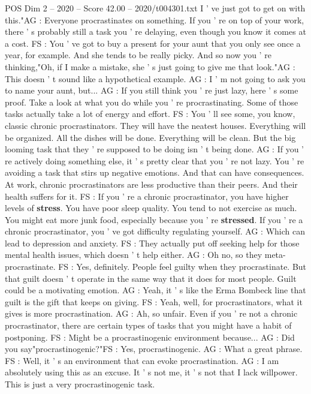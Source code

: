 \begin{textsample}{POS Dim 2 – 2020 – Score 42.00 – 2020/t004301.txt}
I ' ve just got to get on with this."AG : Everyone procrastinates on something.
If you ' re on top of your work, there ' s probably still a task you ' re delaying, even though you know it comes at a cost.
FS : You ' ve got to buy a present for your aunt that you only see once a year, for example.
And she tends to be really picky.
And so now you ' re thinking,"Oh, if I make a mistake, she ' s just going to give me that look."AG : This doesn ' t sound like a hypothetical example.
AG : I ' m not going to ask you to name your aunt, but...
AG : If you still think you ' re just lazy, here ' s some proof.
Take a look at what you do while you ' re procrastinating.
Some of those tasks actually take a lot of energy and effort.
FS : You ' ll see some, you know, classic chronic procrastinators.
They will have the neatest houses.
Everything will be organized.
All the dishes will be done.
Everything will be clean.
But the big looming task that they ' re supposed to be doing isn ' t being done.
AG : If you ' re actively doing something else, it ' s pretty clear that you ' re not lazy.
You ' re avoiding a task that stirs up negative emotions.
And that can have consequences.
At work, chronic procrastinators are less productive than their peers.
And their health suffers for it.
FS : If you ' re a chronic procrastinator, you have higher levels of \textbf{stress}.
You have poor sleep quality.
You tend to not exercise as much.
You might eat more junk food, especially because you ' re \textbf{stressed}.
If you ' re a chronic procrastinator, you ' ve got difficulty regulating yourself.
AG : Which can lead to depression and anxiety.
FS : They actually put off seeking help for those mental health issues, which doesn ' t help either.
AG : Oh no, so they meta-procrastinate.
FS : Yes, definitely.
People feel guilty when they procrastinate.
But that guilt doesn ' t operate in the same way that it does for most people.
Guilt could be a motivating emotion.
AG : Yeah, it ' s like the Erma Bombeck line that guilt is the gift that keeps on giving.
FS : Yeah, well, for procrastinators, what it gives is more procrastination.
AG : Ah, so unfair.
Even if you ' re not a chronic procrastinator, there are certain types of tasks that you might have a habit of postponing.
FS : Might be a procrastinogenic environment because...
AG : Did you say"procrastinogenic?"FS : Yes, procrastinogenic.
AG : What a great phrase.
FS : Well, it ' s an environment that can evoke procrastination.
AG : I am absolutely using this as an excuse.
It ' s not me, it ' s not that I lack willpower.
This is just a very procrastinogenic task.

\end{textsample}
